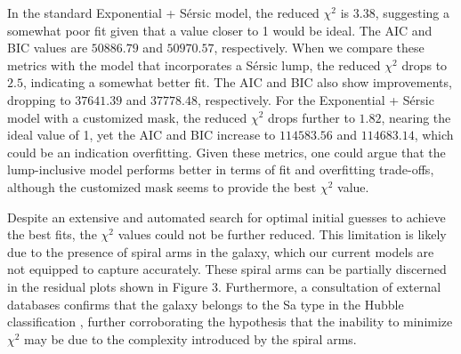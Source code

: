In the standard Exponential + Sérsic model, the reduced \(\chi^{2}\) is \(3.38\), suggesting a somewhat poor fit given that a value closer to 1 would be ideal. The AIC and BIC values are \(50886.79\) and \(50970.57\), respectively. When we compare these metrics with the model that incorporates a Sérsic lump, the reduced \(\chi^{2}\) drops to \(2.5\), indicating a somewhat better fit. The AIC and BIC also show improvements, dropping to \(37641.39\) and \(37778.48\), respectively. For the Exponential + Sérsic model with a customized mask, the reduced \(\chi^{2}\) drops further to \(1.82\), nearing the ideal value of 1, yet the AIC and BIC increase to \(114583.56\) and \(114683.14\), which could be an indication overfitting. Given these metrics, one could argue that the lump-inclusive model performs better in terms of fit and overfitting trade-offs, although the customized mask seems to provide the best \(\chi^{2}\) value.

Despite an extensive and automated search for optimal initial guesses to achieve the best fits, the \(\chi^{2}\) values could not be further reduced. This limitation is likely due to the presence of spiral arms in the galaxy, which our current models are not equipped to capture accurately. These spiral arms can be partially discerned in the residual plots shown in Figure 3. Furthermore, a consultation of external databases confirms that the galaxy belongs to the Sa type in the Hubble classification \citep{ned}, further corroborating the hypothesis that the inability to minimize \(\chi^{2}\) may be due to the complexity introduced by the spiral arms.


